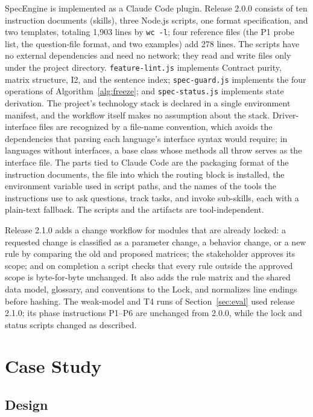 \documentclass[conference]{IEEEtran}
\newcommand{\code}[1]{\texttt{#1}}
\begin{document}
SpecEngine is implemented as a Claude Code plugin. Release 2.0.0 consists of ten instruction documents (skills), three Node.js scripts, one format specification, and two templates, totaling 1,903 lines by \code{wc -l}; four reference files (the P1 probe list, the question-file format, and two examples) add 278 lines. The scripts have no external dependencies and need no network; they read and write files only under the project directory. \code{feature-lint.js} implements Contract purity, matrix structure, I2, and the sentence index; \code{spec-guard.js} implements the four operations of Algorithm~\ref{alg:freeze}; and \code{spec-status.js} implements state derivation. The project's technology stack is declared in a single environment manifest, and the workflow itself makes no assumption about the stack. Driver-interface files are recognized by a file-name convention, which avoids the dependencies that parsing each language's interface syntax would require; in languages without interfaces, a base class whose methods all throw serves as the interface file. The parts tied to Claude Code are the packaging format of the instruction documents, the file into which the routing block is installed, the environment variable used in script paths, and the names of the tools the instructions use to ask questions, track tasks, and invoke sub-skills, each with a plain-text fallback. The scripts and the artifacts are tool-independent.

Release 2.1.0 adds a change workflow for modules that are already locked: a requested change is classified as a parameter change, a behavior change, or a new rule by comparing the old and proposed matrices; the stakeholder approves its scope; and on completion a script checks that every rule outside the approved scope is byte-for-byte unchanged. It also adds the rule matrix and the shared data model, glossary, and conventions to the Lock, and normalizes line endings before hashing. The weak-model and T4 runs of Section~\ref{sec:eval} used release 2.1.0; its phase instructions P1--P6 are unchanged from 2.0.0, while the lock and status scripts changed as described.

\section{Case Study}\label{sec:case}

\subsection{Design}
\end{document}
